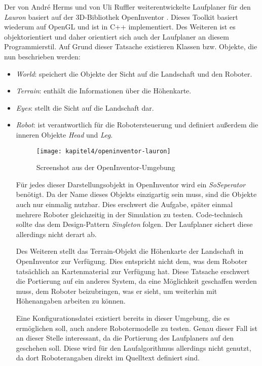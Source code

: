 Der von André Herms \autocite{herms2004} und von Uli Ruffler \autocite{ruffler2006} weiterentwickelte Laufplaner für den \emph{Lauron} basiert auf der 3D-Bibliothek OpenInventor \autocite{inventor}. Dieses Toolkit basiert wiederum auf OpenGL und ist in C++ implementiert. Des Weiteren ist es objektorientiert und daher orientiert sich auch der Laufplaner an diesem Programmierstil. Auf Grund dieser Tatsache existieren Klassen bzw. Objekte, die nun beschrieben werden:
\begin{itemize}
  \item \emph{World}: speichert die Objekte der Sicht auf die Landschaft und den Roboter. 
  \item \emph{Terrain}: enthält die Informationen über die Höhenkarte.
  \item \emph{Eyes}: stellt die Sicht auf die Landschaft dar.
  \item \emph{Robot}: ist verantwortlich für die Robotersteuerung und definiert außerdem die inneren Objekte \emph{Head} und \emph{Leg}.
  
\begin{figure}[t!]
  \centering
  \texttt{[image: kapitel4/openinventor-lauron]}
  \caption{Screenshot aus der OpenInventor-Umgebung}
  \label{Kap4:OpenInventorLauron}
\end{figure}

Für jedes dieser Darstellungsobjekt in OpenInventor wird ein \emph{SoSeperator} benötigt. Da der Name dieses Objekts einzigartig sein muss, sind die Objekte auch nur einmalig nutzbar. Dies erschwert die Aufgabe, später einmal mehrere Roboter gleichzeitig in der Simulation zu testen. Code-technisch sollte das dem Design-Pattern \emph{Singleton} folgen. Der Laufplaner sichert diese allerdings nicht derart ab.

Des Weiteren stellt das Terrain-Objekt die Höhenkarte der Landschaft in OpenInventor zur Verfügung. Dies entspricht nicht dem, was dem Roboter tatsächlich an Kartenmaterial zur Verfügung hat. Diese Tatsache erschwert die Portierung auf ein anderes System, da eine Möglichkeit geschaffen werden muss, dem Roboter beizubringen, was er sieht, um weiterhin mit Höhenangaben arbeiten zu können.

Eine Konfigurationsdatei existiert bereits in dieser Umgebung, die es ermöglichen soll, auch andere Robotermodelle zu testen. Genau dieser Fall ist an dieser Stelle interessant, da die Portierung des Laufplaners auf den  geschehen soll. Diese wird für den Laufalgorithmus allerdings nicht genutzt, da dort Roboterangaben direkt im Quelltext definiert sind.


\end{itemize}
